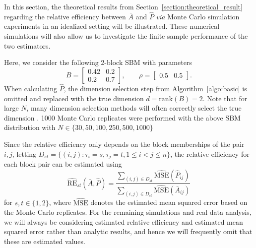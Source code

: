 \documentclass[journal,twoside,web]{ieeecolor}
\begin{document}
In this section, the theoretical results from Section~\ref{section:theoretical_result} regarding the relative efficiency between $\bar{A}$ and $\hat{P}$ \textit{via} Monte Carlo simulation experiments in an idealized setting will be illustrated.
These numerical simulations will also allow us to investigate the finite sample performance of the two estimators.

Here, we consider the following 2-block SBM with parameters
\begin{equation*}
B = \begin{bmatrix}
0.42 & 0.2 \\
0.2 & 0.7
\end{bmatrix}
,\qquad \rho = \begin{bmatrix}
0.5 & 0.5
\end{bmatrix}.
\end{equation*}
When calculating $\hat{P}$, the dimension selection step from Algorithm~\ref{algo:basic} is omitted and replaced with the true dimension $d = \mathrm{rank}(B) = 2$.
Note that for large $N$, many dimension selection methods will often correctly select the true dimension \cite{chatterjee2015matrix,Fishkind2012}.
1000 Monte Carlo replicates were performed with the above SBM distribution with $N \in \{30, 50, 100, 250, 500, 1000 \}$

Since the relative efficiency only depends on the block memberships of the pair $i,j$, letting $D_{st} = \{(i, j): \tau_i=s,\tau_j=t,1 \le i < j \le n\}$, the relative efficiency for each block pair can be estimated using
\[
    \hat{\mathrm{RE}}_{st}(\bar{A},\hat{P}) = \frac{\sum_{(i, j) \in D_{st}} \hat{\mathrm{MSE}}(\hat{P}_{ij})}{\sum_{(i, j) \in D_{st}} \hat{\mathrm{MSE}}(\bar{A}_{ij})}
\]
for $s,t\in\{1,2\}$, where $\hat{\mathrm{MSE}}$ denotes the estimated mean squared error based on the Monte Carlo replicates.
For the remaining simulations and real data analysis, we will always be considering estimated relative efficiency and estimated mean squared error rather than analytic results, and hence we will frequently omit that these are estimated values. %
\end{document}

